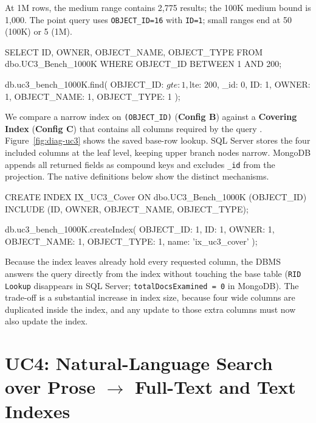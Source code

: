 At 1M rows, the medium range contains 2,775 results; the 100K medium bound is 1,000. The point query uses \texttt{OBJECT\_ID=16} with \texttt{ID=1}; small ranges end at 50 (100K) or 5 (1M).
\begin{SQLCode}
SELECT ID, OWNER, OBJECT_NAME, OBJECT_TYPE
FROM dbo.UC3_Bench_1000K
WHERE OBJECT_ID BETWEEN 1 AND 200;
\end{SQLCode}
\begin{MongoCode}
db.uc3_bench_1000K.find(
  {OBJECT_ID: {$gte: 1, $lte: 200}},
  {_id: 0, ID: 1, OWNER: 1,
   OBJECT_NAME: 1, OBJECT_TYPE: 1}
);
\end{MongoCode}

We compare a narrow index on \texttt{(OBJECT\_ID)} (\textbf{Config B}) against a \textbf{Covering Index} (\textbf{Config C}) that contains all columns required by the query \cite{mssqlinclude,mongoexplain}. Figure~\ref{fig:diag-uc3} shows the saved base-row lookup. SQL Server stores the four included columns at the leaf level, keeping upper branch nodes narrow. MongoDB appends all returned fields as compound keys and excludes \texttt{\_id} from the projection. The native definitions below show the distinct mechanisms.

\begin{SQLCode}
CREATE INDEX IX_UC3_Cover ON dbo.UC3_Bench_1000K
  (OBJECT_ID) INCLUDE (ID, OWNER, OBJECT_NAME, OBJECT_TYPE);
\end{SQLCode}
\begin{MongoCode}
db.uc3_bench_1000K.createIndex(
  {OBJECT_ID: 1, ID: 1, OWNER: 1,
   OBJECT_NAME: 1, OBJECT_TYPE: 1},
  {name: 'ix_uc3_cover'}
);
\end{MongoCode}

Because the index leaves already hold every requested column, the DBMS answers the query directly from the index without touching the base table (\texttt{RID Lookup} disappears in SQL Server; \texttt{totalDocsExamined = 0} in MongoDB). 
The trade-off is a substantial increase in index size, because four wide columns are duplicated inside the index, and any update to those extra columns must now also update the index.

\UCThreeDiagram

\section{UC4: Natural-Language Search over Prose \texorpdfstring{$\rightarrow$}{->} Full-Text and Text Indexes}

